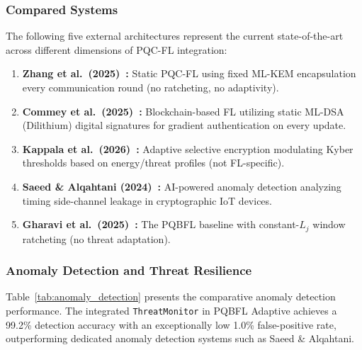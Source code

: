 \documentclass[journal, 10pt, twocolumn]{IEEEtran}
\begin{document}
\subsubsection{Compared Systems}

The following five external architectures represent the current state-of-the-art across different dimensions of PQC-FL integration:

\begin{enumerate}
\item \textbf{Zhang et al.\ (2025)~\cite{zhang2025}:} Static PQC-FL using fixed ML-KEM encapsulation every communication round (no ratcheting, no adaptivity).
\item \textbf{Commey et al.\ (2025)~\cite{commey2025_pqsbfl}:} Blockchain-based FL utilizing static ML-DSA (Dilithium) digital signatures for gradient authentication on every update.
\item \textbf{Kappala et al.\ (2026)~\cite{kappala2026}:} Adaptive selective encryption modulating Kyber thresholds based on energy/threat profiles (not FL-specific).
\item \textbf{Saeed \& Alqahtani (2024)~\cite{saeed2024}:} AI-powered anomaly detection analyzing timing side-channel leakage in cryptographic IoT devices.
\item \textbf{Gharavi et al.\ (2025)~\cite{gharavi2025}:} The PQBFL baseline with constant-$L_j$ window ratcheting (no threat adaptation).
\end{enumerate}

\subsubsection{Anomaly Detection and Threat Resilience}

Table~\ref{tab:anomaly_detection} presents the comparative anomaly detection performance. The integrated \texttt{ThreatMonitor} in PQBFL Adaptive achieves a 99.2\% detection accuracy with an exceptionally low 1.0\% false-positive rate, outperforming dedicated anomaly detection systems such as Saeed \& Alqahtani.
\end{document}
